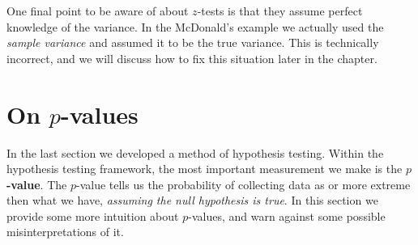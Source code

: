 One final point to be aware of about $z$-tests is that they assume perfect knowledge of the variance. In the McDonald's example we actually used the \emph{sample variance} and assumed it to be the true variance. This is technically incorrect, and we will discuss how to fix this situation later in the chapter.






\section{On $p$-values} \label{sec:P-values}



In the last section we developed a method of hypothesis testing. Within the hypothesis testing framework, the most important measurement we make is the \textbf{$p$-value}. The $p$-value tells us the probability of collecting data as or more extreme then what we have, \emph{assuming the null hypothesis is true}. In this section we provide some more intuition about $p$-values, and warn against some possible misinterpretations of it.











